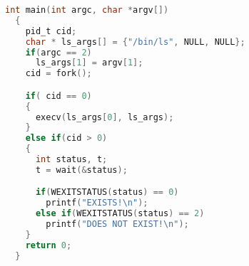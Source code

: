 \documentclass{article}[9pt]
\newenvironment{answerfont}{\fontfamily{qhv}\selectfont}{\par}
\newenvironment{myanswer}{\begin{mdframed}\begin{answerfont}}{\end{answerfont}\end{mdframed}}
\begin{document}
\begin{enumerate}
\begin{myanswer}
\begin{lstlisting}[language=c]
  int main(int argc, char *argv[])
  {
    pid_t cid;
    char * ls_args[] = {"/bin/ls", NULL, NULL};
    if(argc == 2)
      ls_args[1] = argv[1];
    cid = fork();

    if( cid == 0)
    {
      execv(ls_args[0], ls_args);
    }
    else if(cid > 0)
    {
      int status, t;
      t = wait(&status);

      if(WEXITSTATUS(status) == 0)
        printf("EXISTS!\n");
      else if(WEXITSTATUS(status) == 2)
        printf("DOES NOT EXIST!\n");
    }
    return 0;
  }
  \end{lstlisting}
  \end{myanswer}

\end{enumerate}
\end{document}
